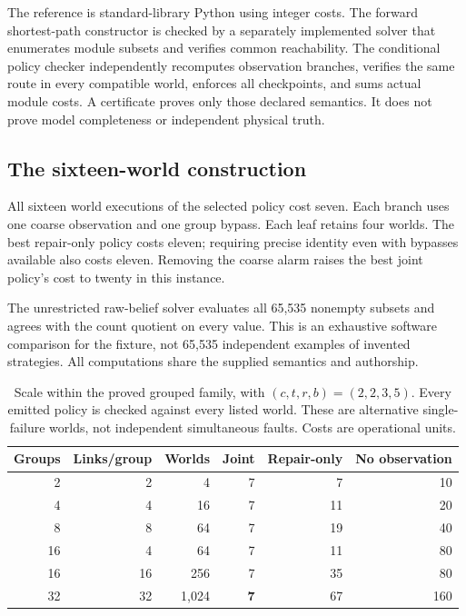 \documentclass[11pt,letterpaper]{article}
\theoremstyle{remark}\newtheorem{remark}{Remark}[section]
\begin{document}
The reference is standard-library Python using integer costs. The forward shortest-path constructor is checked by a separately implemented solver that enumerates module subsets and verifies common reachability. The conditional policy checker independently recomputes observation branches, verifies the same route in every compatible world, enforces all checkpoints, and sums actual module costs. A certificate proves only those declared semantics. It does not prove model completeness or independent physical truth.

\subsection{The sixteen-world construction}
All sixteen world executions of the selected policy cost seven. Each branch uses one coarse observation and one group bypass. Each leaf retains four worlds. The best repair-only policy costs eleven; requiring precise identity even with bypasses available also costs eleven. Removing the coarse alarm raises the best joint policy's cost to twenty in this instance.

The unrestricted raw-belief solver evaluates all 65,535 nonempty subsets and agrees with the count quotient on every value. This is an exhaustive software comparison for the fixture, not 65,535 independent examples of invented strategies. All computations share the supplied semantics and authorship.

\begin{table}[htbp]\centering\small
\caption{Scale within the proved grouped family, with $(c,t,r,b)=(2,2,3,5)$. Every emitted policy is checked against every listed world. These are alternative single-failure worlds, not independent simultaneous faults. Costs are operational units.}\label{tab:scale}
\begin{tabular}{@{}rrrrrr@{}}\toprule
Groups & Links/group & Worlds & Joint & Repair-only & No observation\\\midrule
2 & 2 & 4 & 7 & 7 & 10\\
4 & 4 & 16 & 7 & 11 & 20\\
8 & 8 & 64 & 7 & 19 & 40\\
16 & 4 & 64 & 7 & 11 & 80\\
16 & 16 & 256 & 7 & 35 & 80\\
32 & 32 & 1,024 & \textbf{7} & 67 & 160\\\bottomrule
\end{tabular}
\end{table}
\end{document}
